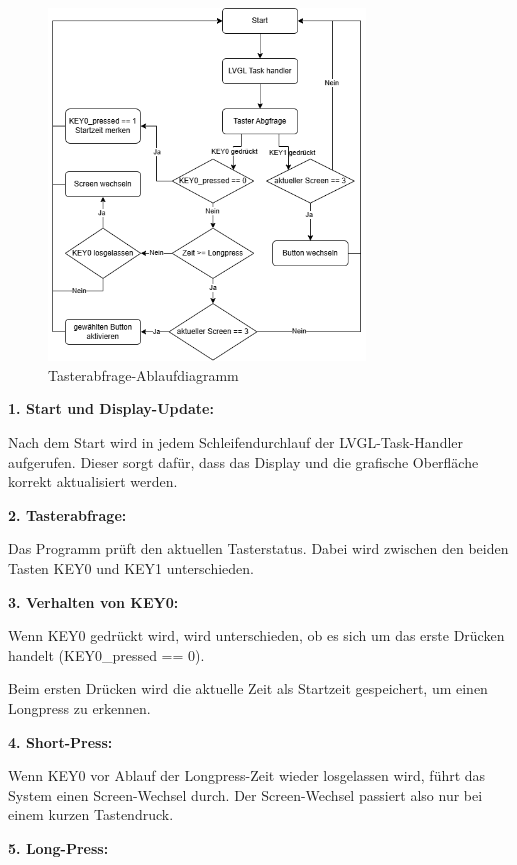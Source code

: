 \begin{inhalt}
\begin{figure}[H]
\centering
\includegraphics[width=0.75\textwidth]{files/Tobias/pics/Diagramme/Tasterabfrage1.png}
\caption[Tasterabfrage-Ablaufdiagramm]{Tasterabfrage-Ablaufdiagramm}
\label{fig:Tasterabfrage-Ablaufdiagramm}
\end{figure}

\textbf{1. Start und Display-Update:}

Nach dem Start wird in jedem Schleifendurchlauf der LVGL-Task-Handler aufgerufen. Dieser sorgt dafür, dass das Display und die grafische Oberfläche korrekt aktualisiert werden.

\textbf{2. Tasterabfrage:}

Das Programm prüft den aktuellen Tasterstatus. Dabei wird zwischen den beiden Tasten KEY0 und KEY1 unterschieden.

\textbf{3. Verhalten von KEY0:}

Wenn KEY0 gedrückt wird, wird unterschieden, ob es sich um das erste Drücken handelt (KEY0\_pressed == 0).

Beim ersten Drücken wird die aktuelle Zeit als Startzeit gespeichert, um einen Longpress zu erkennen.

\textbf{4. Short-Press:}

Wenn KEY0 vor Ablauf der Longpress-Zeit wieder losgelassen wird, führt das System einen Screen-Wechsel durch. Der Screen-Wechsel passiert also nur bei einem kurzen Tastendruck.

\textbf{5. Long-Press:}


\end{inhalt}
